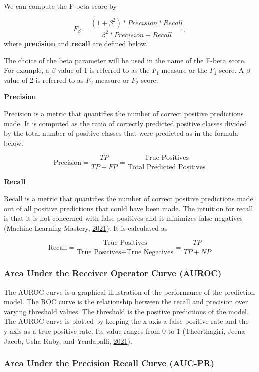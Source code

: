 \documentclass[
  10pt,
]{article}
\begin{document}
We can compute the F-beta score by

\[
  F_\beta = \frac{(1 + \beta^2) * Precision * Recall}{\beta^2 * Precision + Recall},
\]
where \textbf{precision} and \textbf{recall} are defined below.

The choice of the beta parameter will be used in the name of the F-beta score. For example, a \(\beta\) value of 1 is referred to as the \(F_1\)-measure or the \(F_1\) score. A \(\beta\) value of 2 is referred to as \(F_2\)-measure or \(F_2\)-score.

\textbf{Precision}

Precision is a metric that quantifies the number of correct positive predictions made. It is computed as the ratio of correctly predicted positive classes divided by the total number of positive classes that were predicted as in the formula below.

\[
\text{Precision} = \frac{TP}{TP + FP} = \frac{\text{True Positives}}{\text{Total Predicted Positives}}
\]

\textbf{Recall}

Recall is a metric that quantifies the number of correct positive predictions made out of all positive predictions that could have been made. The intuition for recall is that it is not concerned with false positives and it minimizes false negatives (Machine Learning Mastery, \protect\hyperlink{ref-MLM}{2021}). It is calculated as

\[
\text{Recall} = \frac{\text{True Positives}}{\text{True Positives} + \text{True Negatives}} = \frac{TP}{TP + NP}
\]

\hypertarget{area-under-the-receiver-operator-curve-auroc}{%
\subsubsection{Area Under the Receiver Operator Curve (AUROC)}\label{area-under-the-receiver-operator-curve-auroc}}

The AUROC curve is a graphical illustration of the performance of the prediction model. The
ROC curve is the relationship between the recall and precision over varying threshold values. The threshold is the positive predictions of the model. The AUROC curve is plotted by keeping the x-axis a false positive rate and the y-axis as a true positive rate. Its value ranges from 0 to 1 (Theerthagiri, Jeena Jacob, Usha Ruby, and Yendapalli, \protect\hyperlink{ref-theerthagiri2021prediction}{2021}).

\hypertarget{area-under-the-precision-recall-curve-auc-pr}{%
\subsubsection{Area Under the Precision Recall Curve (AUC-PR)}\label{area-under-the-precision-recall-curve-auc-pr}}
\end{document}
